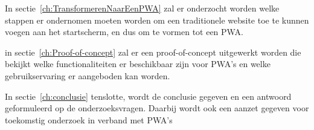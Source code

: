 	In sectie~\ref{ch:TransformerenNaarEenPWA} zal er onderzocht worden welke stappen er ondernomen moeten worden om een traditionele website toe te kunnen voegen aan het startscherm, en dus om te vormen tot een PWA.
	
	in sectie~\ref{ch:Proof-of-concept} zal er een proof-of-concept uitgewerkt worden die bekijkt welke functionaliteiten er beschikbaar zijn voor PWA's en welke gebruikservaring er aangeboden kan worden. 
	
	In sectie~\ref{ch:conclusie} tenslotte, wordt de conclusie gegeven en een antwoord geformuleerd op de onderzoeksvragen. Daarbij wordt ook een aanzet gegeven voor toekomstig onderzoek in verband met PWA's






